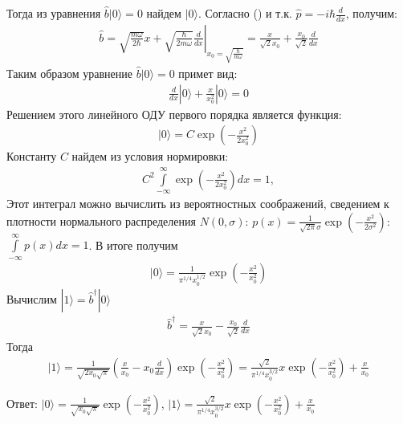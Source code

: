 Тогда из уравнения $\hat{b}|0\rangle = 0$ найдем $|0\rangle$. Согласно () и т.к. $\hat{p}=-i\hbar\frac{d}{dx}$, получим:
\begin{gather*}
\hat{b}
=
\left.
\sqrt{\frac{m\omega}{2\hbar}}x+\sqrt{\frac{\hbar}{2m\omega}}\frac{d}{dx}
\right|_{x_0=\sqrt{\frac{\hbar}{m\omega}}}
=
\frac{x}{\sqrt{2}x_0}+\frac{x_0}{\sqrt{2}}\frac{d}{dx}
\end{gather*}
Таким образом уравнение $\hat{b}|0\rangle = 0$ примет вид:
\begin{gather*}
\frac{d}{dx}|0\rangle + \frac{x}{x_0^2}|0\rangle = 0
\end{gather*}
Решением этого линейного ОДУ первого порядка является функция:
\begin{gather*}
|0\rangle = C\exp\left(-\frac{x^2}{2x_0^2}\right)
\end{gather*}
Константу $C$ найдем из условия нормировки:
\begin{gather*}
C^2\int\limits_{-\infty}^{\infty}\exp\left(-\frac{x^2}{2x_0^2}\right)dx=1,
\end{gather*}
Этот интеграл можно вычислить из вероятностных соображений, сведением к плотности нормального распределения $N(0,\sigma)$: $p(x)=\frac{1}{\sqrt{2\pi}\sigma}\exp\left(-\frac{x^2}{2\sigma^2}\right)$: $\int\limits_{-\infty}^{\infty}p(x)dx=1$.
В итоге получим
\begin{gather*}
|0\rangle = \frac{1}{\pi^{1/4}x_0^{1/2}}\exp\left(-\frac{x^2}{x_0^2}\right)
\end{gather*}
Вычислим $|1\rangle = \hat{b}^\dagger|0\rangle$
\begin{gather*}
\hat{b}^\dagger
=
\frac{x}{\sqrt{2}x_0}-\frac{x_0}{\sqrt{2}}\frac{d}{dx}
\end{gather*}
Тогда
\begin{gather*}
|1\rangle
=
\frac{1}{\sqrt{2x_0\sqrt{\pi}}}\left(\frac{x}{x_0}-x_0\frac{d}{dx}\right)\exp\left(-\frac{x^2}{x_0^2}\right)
=
\frac{\sqrt{2}}{\pi^{1/4}x_0^{3/2}}x\exp\left(-\frac{x^2}{x_0^2}\right) + \frac{x}{x_0}
\end{gather*}

Ответ: $|0\rangle = \frac{1}{\sqrt{x_0\sqrt{\pi}}}\exp\left(-\frac{x^2}{x_0^2}\right)$, 
       $|1\rangle = \frac{\sqrt{2}}{\pi^{1/4}x_0^{3/2}}x\exp\left(-\frac{x^2}{x_0^2}\right) + \frac{x}{x_0}$

